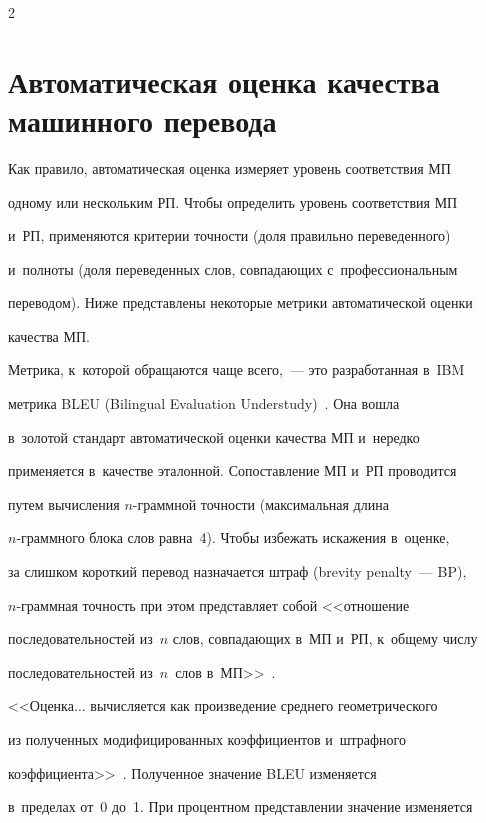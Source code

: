 \begin{multicols}{2}
  \section{Автоматическая оценка качества машинного перевода}


  


  Как правило, автоматическая оценка измеряет уровень соответствия МП 


одному или нескольким РП. Чтобы определить уровень соответствия МП 


и~РП, применяются критерии точности (доля правильно переведенного) 


и~полноты (доля переведенных слов, совпадающих с~профессиональным 


переводом). Ниже представлены некоторые метрики автоматической оценки 


качества МП.


  


  Метрика, к~которой обращаются чаще всего,~--- это разработанная в~IBM 


метрика BLEU (Bilingual Evaluation Understudy)~\cite{6-nur}. Она вошла 


в~золотой стандарт автоматической оценки качества МП и~нередко 


применяется в~качестве эталонной. Сопоставление МП и~РП проводится 


путем вы\-чис\-ле\-ния $n$-грам\-мной точ\-ности (максимальная длина  


$n$-грам\-мно\-го блока слов равна~4). Чтобы избежать искажения в~оценке, 


за слишком короткий перевод назначается штраф (brevity penalty~--- BP),  


$n$-грам\-мная точ\-ность при этом представляет собой <<отношение 


последовательностей из~$n$ слов, совпадающих в~МП и~РП, к~общему числу 


последовательностей из~$n$~слов в~МП>>~\cite[с.~111--112]{7-nur}. 


<<Оценка$\ldots$ вычисляется как произведение среднего геометрического 


из полученных модифицированных коэффициентов и~штрафного 


коэффициента>>~\cite[с.~86]{8-nur}. Полученное значение BLEU изменяется 


в~пределах от~0 до~1. При процентном представлении значение изменяется 



\end{multicols}
